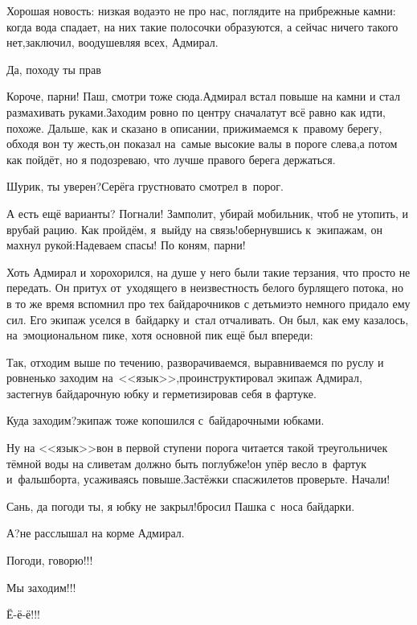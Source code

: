 \diagdash Хорошая новость: низкая вода\mdash это не про нас, поглядите на прибрежные камни: когда вода спадает, на них такие полосочки образуются, а сейчас ничего такого нет,\mdash заключил, воодушевляя всех, Адмирал.

\diagdash Да, походу ты прав\myldots{}

\diagdash Короче, парни! Паш, смотри тоже сюда.\mdash Адмирал встал повыше на камни и стал размахивать руками.\mdash Заходим ровно по центру сначала\mdash тут всё равно как идти, похоже. Дальше, как и сказано в описании, прижимаемся к~правому берегу, обходя вон ту жесть,\mdash он показал на~самые высокие валы в пороге слева,\mdash а потом как пойдёт, но я подозреваю, что лучше правого берега держаться.

\diagdash Шурик, ты уверен?\mdash Серёга грустновато смотрел в~порог.

\diagdash А есть ещё варианты? Погнали! Замполит, убирай мобильник, чтоб не утопить, и врубай рацию. Как пройдём, я~выйду на связь!\mdash обернувшись к~экипажам, он махнул рукой:\mdash Надеваем спасы! По коням, парни!

Хоть Адмирал и хорохорился, на душе у него были такие терзания, что просто не передать. Он притух от~уходящего в неизвестность белого бурлящего потока, но в то же время вспомнил про тех байдарочников с детьми\mdash это немного придало ему сил. Его экипаж уселся в~байдарку и~стал отчаливать. Он был, как ему казалось, на~эмоциональном пике, хотя основной пик ещё был впереди:

\diagdash Так, отходим выше по течению, разворачиваемся, выравниваемся по руслу и ровненько заходим на~<<язык>>,\mdash проинструктировал экипаж Адмирал, застегнув байдарочную юбку и герметизировав себя в фартуке.

\diagdash Куда заходим?\mdash экипаж тоже копошился с~байдарочными юбками.

\diagdash Ну на <<язык>>\mdash вон в первой ступени порога читается такой треугольничек тёмной воды на сливе\mdash там должно быть поглубже!\mdash он упёр весло в~фартук и~фальшборта, усаживаясь повыше.\mdash Застёжки спасжилетов проверьте. Начали!

\diagdash Сань, да погоди ты, я юбку не закрыл!\mdash бросил Пашка с~носа байдарки.

\diagdash А?\mdash не расслышал на корме Адмирал.

\diagdash Погоди, говорю!!!

\diagdash Мы заходим!!!

\diagdash Ё-ё-ё!!!

